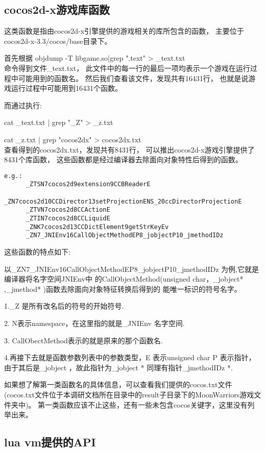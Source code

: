\subsection{cocos2d-x游戏库函数}
\label{sec:so:cocolib}
这类函数是指由cocos2d-x引擎提供的游戏相关的库所包含的函数，
主要位于cocos2d-x-3.3/cocos/base目录下。

首先根据
objdump -T libgame.so|grep ".text" > \_text.txt \\
命令得到文件\_text.txt，
此文件中的每一行的最后一项均表示一个游戏在运行过程中可能用到的函数名。
然后我们查看该文件，发现共有16431行，
也就是说游戏运行过程中可能用到16431个函数。

而通过执行:

cat \_text.txt | grep  "\_Z" > \_z.txt

cat \_z.txt | grep "cocos2dx" > cocos2dx.txt\\
查看得到的cocos2dx.txt，发现共有8431行，
可以推出cocos2d-x游戏引擎提供了8431个库函数，
这些函数都是经过编译器去除面向对象特性后得到的函数。
 
\begin{lstlisting}
e.g.:
      _ZTSN7cocos2d9extension9CCBReaderE
      _ZN7cocos2d10CCDirector13setProjectionENS_20ccDirectorProjectionE
      _ZTVN7cocos2d8CCActionE
      _ZTIN7cocos2d8CCLiquidE
      _ZNK7cocos2d13CCDictElement9getStrKeyEv
      _ZN7_JNIEnv16CallObjectMethodEP8_jobjectP10_jmethodIDz
\end{lstlisting}

这些函数的特点如下:
	
以\_ZN7\_JNIEnv16CallObjectMethodEP8\_jobjectP10\_jmethodIDz 为例,它就是编译器将名字空间JNIEnv中
的CallObjectMethod(unsigned char，\_jobject* ,\_jmethod* )函数去除面向对象特征转换后得到的
能唯一标识的符号名字。

1.\_Z 是所有改名后的符号的开始符号.

2. N表示namespace，在这里指的就是\_JNIEnv 名字空间.

3. CallObectMethod表示的就是原来的那个函数名.

4.再接下去就是函数参数列表中的参数类型，E 表示unsigned char
P 表示指针，由于其后是\_jobject ，故此指针为\_jobject *
同理有指针\_jmethodIDz *.
	
如果想了解第一类函数名的具体信息，可以查看我们提供的cocos.txt文件
(cocos.txt文件位于本调研文档所在目录中的result子目录下的MoonWarriors游戏文件夹中)。
第一类函数应该不止这些，还有一些未包含cocos关键字，这里没有列举出来。


\subsection{lua vm提供的API}
\label{sec:so:lualib}

